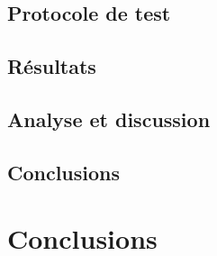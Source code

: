 \documentclass[
a4paper,
11pt,
twoside,
onecolumn,
openright,      %
leqno,          %
final   %
]{phdlasl}
\begin{document}
 	\section{Protocole de test}\label{partie:resultats-protocole}
		

	\section{Résultats}\label{partie:resultats-ordonnancement}
	
	
	\section{Analyse et discussion}\label{partie:analyse-discussion}
	

	\section*{Conclusions}\label{partie:resultats-conclusions}
	
	
	\chapter*{Conclusions}\label{chapitre:conclusions}
		
	
	
      
      
\end{document}
